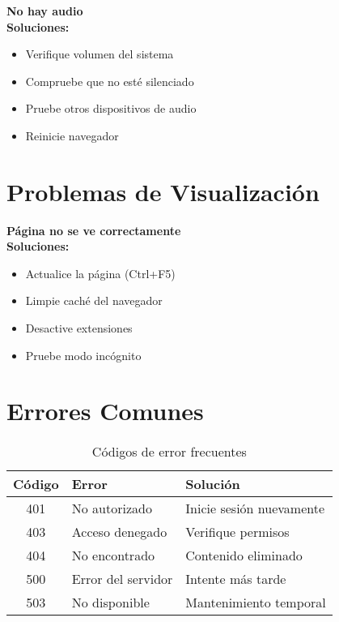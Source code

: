 \documentclass[11pt,a4paper,twoside]{book}
\begin{document}
\begin{errorbox}
\textbf{No hay audio}\\
\textbf{Soluciones:}
\begin{itemize}
    \item Verifique volumen del sistema
    \item Compruebe que no esté silenciado
    \item Pruebe otros dispositivos de audio
    \item Reinicie navegador
\end{itemize}
\end{errorbox}

\section{Problemas de Visualización}

\begin{errorbox}
\textbf{Página no se ve correctamente}\\
\textbf{Soluciones:}
\begin{itemize}
    \item Actualice la página (Ctrl+F5)
    \item Limpie caché del navegador
    \item Desactive extensiones
    \item Pruebe modo incógnito
\end{itemize}
\end{errorbox}

\section{Errores Comunes}

\begin{table}[h]
\small
\centering
\begin{tabular}{@{}clp{6cm}@{}}
\toprule
\textbf{Código} & \textbf{Error} & \textbf{Solución} \\ \midrule
401 & No autorizado & Inicie sesión nuevamente \\
403 & Acceso denegado & Verifique permisos \\
404 & No encontrado & Contenido eliminado \\
500 & Error del servidor & Intente más tarde \\
503 & No disponible & Mantenimiento temporal \\ \bottomrule
\end{tabular}
\caption{Códigos de error frecuentes}
\end{table}
\end{document}
